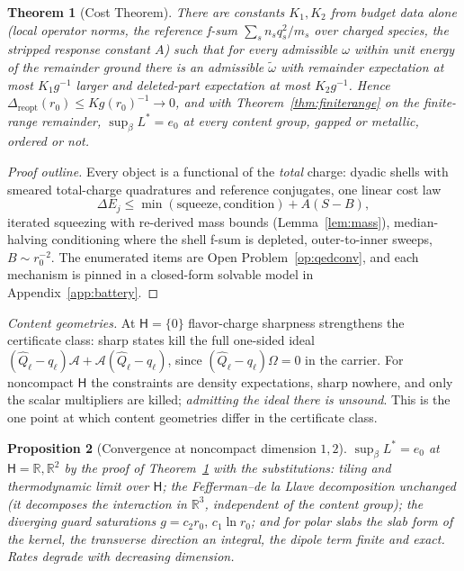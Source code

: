 \documentclass[11pt]{article}
\newtheorem{theorem}{Theorem}[section]
\newtheorem{proposition}[theorem]{Proposition}
\theoremstyle{definition}
\theoremstyle{remark}
\newcommand{\A}{\mathcal{A}}
\begin{document}
\begin{theorem}[Cost Theorem]\label{thm:cost}
There are constants $K_1, K_2$ from budget data alone (local operator norms,
the reference f-sum $\sum_s n_s q_s^2/m_s$ over charged species, the
stripped response constant $A$) such that for every admissible $\omega$
within unit energy of the remainder ground there is an admissible
$\tilde\omega$ with remainder expectation at most $K_1 g^{-1}$ larger and
deleted-part expectation at most $K_2 g^{-1}$.  Hence $\Delta_{\mathrm{reopt}}
(r_0) \le K g(r_0)^{-1} \to 0$, and with Theorem~\ref{thm:finiterange} on
the finite-range remainder, $\sup_\beta L^* = e_0$ at every content group,
gapped or metallic, ordered or not.
\end{theorem}
\begin{proof}[Proof outline]
Every object is a functional of the \emph{total} charge: dyadic shells with
smeared total-charge quadratures and reference conjugates, one linear cost
law
\[
\Delta E_j \le \min(\text{squeeze}, \text{condition}) + A(S-B),
\]
iterated squeezing with re-derived mass bounds (Lemma~\ref{lem:mass}),
median-halving conditioning where the shell f-sum is depleted, outer-to-inner
sweeps, $B \sim r_0^{-2}$.  The enumerated items are Open
Problem~\ref{op:qedconv}, and each mechanism is pinned in a closed-form
solvable model in Appendix~\ref{app:battery}.
\end{proof}

\emph{Content geometries.}  At $\mathsf H = \{0\}$ flavor-charge sharpness
strengthens the certificate class: sharp states kill the full one-sided
ideal $(\hat Q_\ell - q_\ell)\A + \A(\hat Q_\ell - q_\ell)$, since
$(\hat Q_\ell - q_\ell)\Omega = 0$ in the carrier.  For noncompact
$\mathsf H$ the constraints are density expectations, sharp nowhere, and
only the scalar multipliers are killed; \emph{admitting the ideal there is
unsound}.  This is the one point at which content geometries differ in the
certificate class.

\begin{proposition}[Convergence at noncompact dimension $1,2$]\label{prop:lowd}
$\sup_\beta L^* = e_0$ at $\mathsf H = \mathbb R, \mathbb R^2$ by the proof
of Theorem~\ref{thm:cost} with the substitutions: tiling and thermodynamic
limit over $\mathsf H$; the Fefferman--de la Llave decomposition unchanged
(it decomposes the interaction in $\mathbb R^3$, independent of the content
group); the diverging guard saturations $g = c_2 r_0,\, c_1 \ln r_0$; and
for polar slabs the slab form of the kernel, the transverse direction an
integral, the dipole term finite and exact.  Rates degrade with decreasing
dimension.
\end{proposition}
\end{document}
